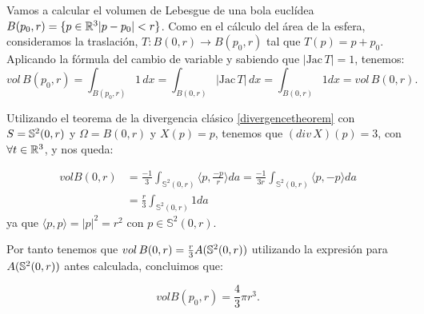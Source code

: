 \begin{remark}
Vamos a calcular el volumen de Lebesgue de una bola euclídea $B(p_0,r)=\{ p \in \mathbb{R}^3 |p-p_0| < r \}$. Como en el cálculo del área de la esfera, consideramos la traslación, $T: B(0, r) \longrightarrow B(p_0, r)$ tal que $T(p) = p + p_0$. Aplicando la fórmula del cambio de variable y sabiendo que $|\text{Jac} \, T|=1$, tenemos:
%
\begin{equation*}
    vol \, B(p_0,r) = \int_{B(p_0,r)} 1 \, dx = \int_{B(0,r)} |\text{Jac} \, T| \, dx = \int_{B(0,r)} 1dx = vol \, B(0,r).
\end{equation*}

Utilizando el teorema de la divergencia clásico \ref{divergencetheorem} con $S=\mathbb{S}^2(0,r)$ y $\Omega=B(0,r)$ y $X(p)=p$, tenemos que $(div \, X)(p)=3$, con $\forall t\in \mathbb{R}^3$, y nos queda:

\begin{align*}
    vol B(0,r) &= \frac{-1}{3} \int_{\mathbb{S}^2(0,r)}  \langle p, \frac{-p}{r} \rangle da = \frac{-1}{3r} \int_{\mathbb{S}^2(0,r)}  \langle p, -p \rangle da \\
    &= \frac{r}{3} \int_{\mathbb{S}^2(0,r)} 1da
\end{align*}
%
ya que $ \langle p,p \rangle  = |p|^2 = r^2$ con $p \in \mathbb{S}^2(0,r)$.

Por tanto tenemos que $vol \, B(0,r) = \frac{r}{3}A(\mathbb{S}^2(0,r))$ utilizando la expresión para $A(\mathbb{S}^2(0,r))$ antes calculada, concluimos que:

\begin{equation*}
    vol B(p_0,r) = \frac{4}{3}\pi r^3.
\end{equation*}
\end{remark}

